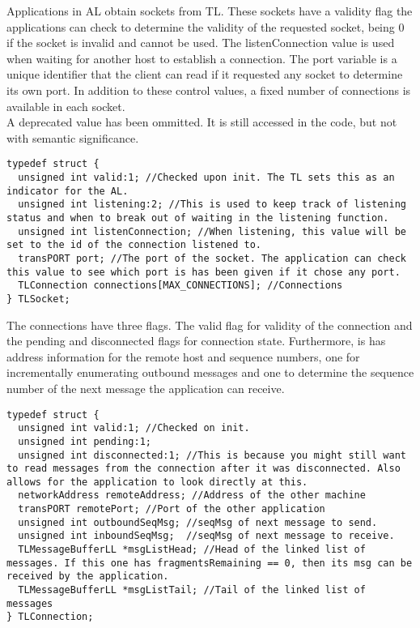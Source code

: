 Applications in AL obtain sockets from TL. These sockets have a validity flag the applications can check to determine the validity of the requested socket, being 0 if the socket is invalid and cannot be used. The listenConnection value is used when waiting for another host to establish a connection. The port variable is a unique identifier that the client can read if it requested any socket to determine its own port. In addition to these control values, a fixed number of connections is available in each socket.\\
A deprecated value has been ommitted. It is still accessed in the code, but not with semantic significance.
\begin{lstlisting}
typedef struct {
  unsigned int valid:1; //Checked upon init. The TL sets this as an indicator for the AL.
  unsigned int listening:2; //This is used to keep track of listening status and when to break out of waiting in the listening function.
  unsigned int listenConnection; //When listening, this value will be set to the id of the connection listened to.
  transPORT port; //The port of the socket. The application can check this value to see which port is has been given if it chose any port.
  TLConnection connections[MAX_CONNECTIONS]; //Connections
} TLSocket;
\end{lstlisting}

The connections have three flags. The valid flag for validity of the connection and the pending and disconnected flags for connection state. Furthermore, is has address information for the remote host and sequence numbers, one for incrementally enumerating outbound messages and one to determine the sequence number of the next message the application can receive.

\begin{lstlisting}
typedef struct {
  unsigned int valid:1; //Checked on init.
  unsigned int pending:1;
  unsigned int disconnected:1; //This is because you might still want to read messages from the connection after it was disconnected. Also allows for the application to look directly at this.
  networkAddress remoteAddress; //Address of the other machine
  transPORT remotePort; //Port of the other application
  unsigned int outboundSeqMsg; //seqMsg of next message to send.
  unsigned int inboundSeqMsg;  //seqMsg of next message to receive.
  TLMessageBufferLL *msgListHead; //Head of the linked list of messages. If this one has fragmentsRemaining == 0, then its msg can be received by the application.
  TLMessageBufferLL *msgListTail; //Tail of the linked list of messages
} TLConnection;
\end{lstlisting}

